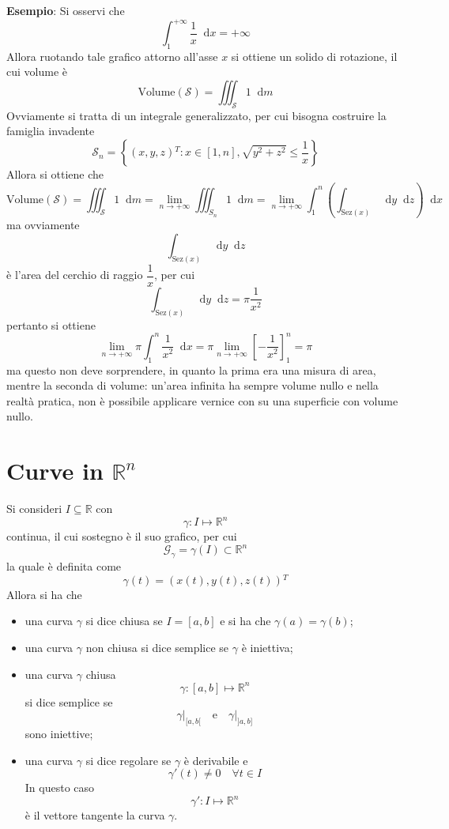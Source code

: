 \documentclass[a4paper]{extarticle}
\newcommand*\dif{\mathop{}\!\mathrm{d}}
\begin{document}
\vspace{2em}
\noindent
\textbf{Esempio}: Si osservi che
\[\int_1^{+\infty} \dfrac{1}{x} \dif x = +\infty\]
Allora ruotando tale grafico attorno all'asse $x$ si ottiene un solido di rotazione, il cui volume è
\[\text{Volume}(\mathcal{S}) = \iiint_\mathcal{S} 1 \dif m\]
Ovviamente si tratta di un integrale generalizzato, per cui bisogna costruire la famiglia invadente
\[\mathcal{S}_n = \left\{(x,y,z){^T} : x \in [1,n], \sqrt{y^2+z^2} \leq \dfrac{1}{x} \right\}\]
Allora si ottiene che
\[\text{Volume}(\mathcal{S}) = \iiint_\mathcal{S} 1 \dif m = \lim_{n \to +\infty} \iiint_{S_n} 1 \dif m = \lim_{n \to +\infty} \int_1^n \left(\int_{\text{Sez}(x)} \dif y \dif z\right) \dif x\]
ma ovviamente 
\[\int_{\text{Sez}(x)} \dif y \dif z\]
è l'area del cerchio di raggio $\dfrac{1}{x}$, per cui
\[\int_{\text{Sez}(x)} \dif y \dif z = \pi \dfrac{1}{x^2}\]
pertanto si ottiene
\[\lim_{n \to +\infty} \pi \int_1^n \dfrac{1}{x^2} \dif x = \pi \lim_{n \to +\infty} \left[-\dfrac{1}{x^2}\right]_1^n = \pi\]
ma questo non deve sorprendere, in quanto la prima era una misura di area, mentre la seconda di volume: un'area infinita ha sempre volume nullo e nella realtà pratica, non è possibile applicare vernice con su una superficie con volume nullo.

\newpage
\section{Curve in $\mathbb{R}^n$}
Si consideri $I \subseteq \mathbb{R}$ con
\[\gamma : I \longmapsto \mathbb{R}^n\]
continua, il cui sostegno è il suo grafico, per cui
\[\mathcal{G}_\gamma = \gamma(I) \subset \mathbb{R}^n\]
la quale è definita come
\[\gamma(t) = (x(t),y(t),z(t)){^T}\]
Allora si ha che
\begin{itemize}
    \item una curva $\gamma$ si dice chiusa se $I=[a,b]$ e si ha che $\gamma(a) = \gamma(b)$;
    \item una curva $\gamma$ non chiusa si dice semplice se $\gamma$ è iniettiva;
    \item una curva $\gamma$ chiusa
    \[\gamma : [a,b] \longmapsto \mathbb{R}^n\]
    si dice semplice se
    \[\gamma \vert_{[a,b[} \hspace{1em} \text{e} \hspace{1em} \gamma \vert_{]a,b]}\]
    sono iniettive;
    \item una curva $\gamma$ si dice regolare se $\gamma$ è derivabile e
    \[\gamma'(t) \neq 0 \hspace{1em} \forall t \in I\]
    In questo caso
    \[\gamma' : I \longmapsto \mathbb{R}^n\]
    è il vettore tangente la curva $\gamma$.
\end{itemize}
\end{document}

